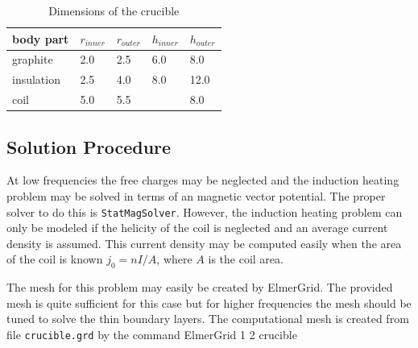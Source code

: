 \begin{table}
\caption{Dimensions of the crucible}
\label{tab:ind_heat2}
\begin{center}
\begin{tabular}{lllll} \hline
body part &  $r_{inner}$ & $r_{outer}$ & $h_{inner}$ & $h_{outer}$ \\ \hline
graphite  &  2.0   &  2.5 & 6.0 & 8.0 \\
insulation &  2.5   &  4.0 & 8.0 & 12.0 \\
coil      &  5.0   & 5.5  &     & 8.0  \\ \hline
\end{tabular}
\end{center}
\end{table}


\subsection*{Solution Procedure}

At low frequencies the free charges may be neglected and the 
induction heating problem may be solved in terms 
of an magnetic vector potential. The proper solver to do
this is \texttt{StatMagSolver}.
However, the induction heating problem can only be modeled if the helicity 
of the coil is neglected and an average current density is assumed.
This current density may be computed easily when the 
area of the coil is known $j_0=n I / A$, where $A$ is the 
coil area.

The mesh for this problem may easily be created by ElmerGrid.
The provided mesh is quite sufficient for this case
but for higher frequencies the mesh should be tuned 
to solve the thin boundary layers.
The computational mesh is created from file \texttt{crucible.grd} by the 
command 
\ttbegin
ElmerGrid 1 2 crucible
\ttend

